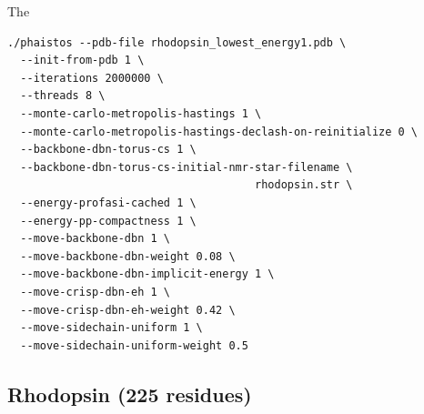 The 

\begin{lstlisting}
./phaistos --pdb-file rhodopsin_lowest_energy1.pdb \
  --init-from-pdb 1 \
  --iterations 2000000 \
  --threads 8 \
  --monte-carlo-metropolis-hastings 1 \
  --monte-carlo-metropolis-hastings-declash-on-reinitialize 0 \
  --backbone-dbn-torus-cs 1 \
  --backbone-dbn-torus-cs-initial-nmr-star-filename \
                                      rhodopsin.str \
  --energy-profasi-cached 1 \
  --energy-pp-compactness 1 \
  --move-backbone-dbn 1 \
  --move-backbone-dbn-weight 0.08 \
  --move-backbone-dbn-implicit-energy 1 \
  --move-crisp-dbn-eh 1 \
  --move-crisp-dbn-eh-weight 0.42 \
  --move-sidechain-uniform 1 \
  --move-sidechain-uniform-weight 0.5
\end{lstlisting}


\subsection{Rhodopsin (225 residues)}

